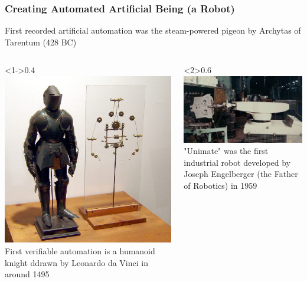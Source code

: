 \documentclass{beamer}
\begin{document}
\begin{frame}
  \frametitle{Creating Automated Artificial Being (a Robot)}
  First recorded artificial automation was the steam-powered pigeon by Archytas of Tarentum (428 BC)

  \begin{columns}
    \begin{column}<1->{0.4\textwidth}
      \includegraphics[width=\textwidth]{Leonardo-Robot.jpg}
      First verifiable automation is a humanoid knight ddrawn by Leonardo da Vinci in around 1495  
    \end{column}
    \begin{column}<2>{0.6\textwidth}
      \href{https://www.youtube.com/watch?v=-Xl2c91pWGc}{\includegraphics[width=\textwidth]{Unimate001.jpeg}}  
      "Unimate" was the first industrial robot developed by Joseph Engelberger (the Father of Robotics) in 1959
    \end{column}

  \end{columns}

\end{frame}
\end{document}
